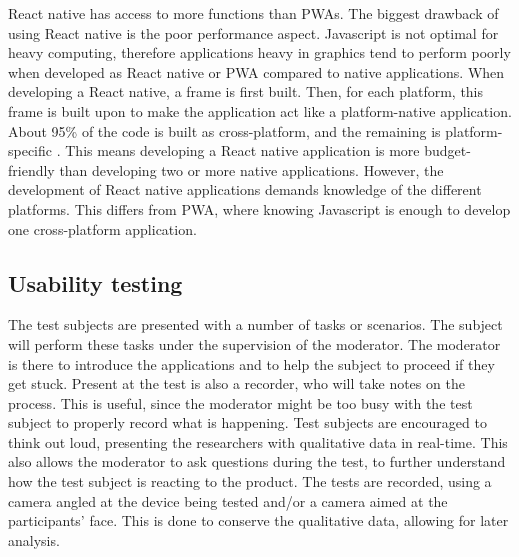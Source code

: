 React native has access to more functions than PWAs. The biggest drawback of using React native is the poor performance aspect. Javascript is not optimal for heavy computing, therefore applications heavy in graphics tend to perform poorly when developed as React native or PWA compared to native applications. 
When developing a React native, a frame is first built. Then, for each platform, this frame is built upon to make the application act like a platform-native application. About 95\% of the code is built as cross-platform, and the remaining is platform-specific \cite{Ganguly2018}. This means developing a React native application is more budget-friendly than developing two or more native applications. However, the development of React native applications demands knowledge of the different platforms. This differs from PWA, where knowing Javascript is enough to develop one cross-platform application.

\subsection{Usability testing}
The test subjects are presented with a number of tasks or scenarios. The subject will perform these tasks under the supervision of the moderator. The moderator is there to introduce the applications and to help the subject to proceed if they get stuck. Present at the test is also a recorder, who will take notes on the process. This is useful, since the moderator might be too busy with the test subject to properly record what is happening. 
Test subjects are encouraged to think out loud, presenting the researchers with qualitative data in real-time. This also allows the moderator to ask questions during the test, to further understand how the test subject is reacting to the product. 
The tests are recorded, using a camera angled at the device being tested and/or a camera aimed at the participants’ face. This is done to conserve the qualitative data, allowing for later analysis. \newline

